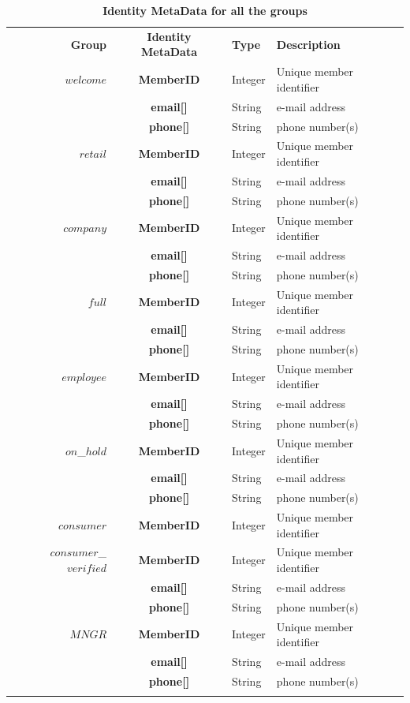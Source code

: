 \begin{table}[H]
\vspace{-0.5cm}
\begin{centering}
\small
{
\begin{tabular}{ r | c | l | l }
\hline
\textbf{Group}	& {\bf Identity MetaData} & {\bf Type} & {\bf Description} \\
\Xhline{1.5pt}
$welcome$	& {\bf MemberID}			&Integer	& Unique member identifier \\
			& {\bf email[]}				&String	& e-mail address \\		
			& {\bf phone[]}				&String	& phone number(s) \\
\hline
$retail$		& {\bf MemberID}			&Integer	& Unique member identifier \\
			& {\bf email[]}				&String	& e-mail address \\
			& {\bf phone[]}				&String	& phone number(s) \\
\hline
$company$	& {\bf MemberID}			&Integer	& Unique member identifier \\
			& {\bf email[]}				&String	& e-mail address \\
			& {\bf phone[]}				&String	& phone number(s) \\
\hline
$full$		& {\bf MemberID}			&Integer	& Unique member identifier \\
			& {\bf email[]}				&String	& e-mail address \\
			& {\bf phone[]}				&String	& phone number(s) \\
\hline
$employee$	& {\bf MemberID}			&Integer	& Unique member identifier \\
			& {\bf email[]}				&String	& e-mail address \\
			& {\bf phone[]}				&String	& phone number(s) \\
\hline
$on$\_$hold$	& {\bf MemberID}			&Integer	& Unique member identifier \\
			& {\bf email[]}				&String	& e-mail address \\
			& {\bf phone[]}				&String	& phone number(s) \\
\hline
$consumer$	& {\bf MemberID}	&Integer & Unique member identifier \\
\hline
$consumer$\_$verified$ & {\bf MemberID}		&Integer	& Unique member identifier \\
			& {\bf email[]}				&String	& e-mail address \\
			& {\bf phone[]}				&String	& phone number(s) \\
\hline
$MNGR$ 		& {\bf MemberID}			&Integer	& Unique member identifier \\
			& {\bf email[]}				&String	& e-mail address \\
			& {\bf phone[]}				&String	& phone number(s) \\
\Xhline{1.5pt}
\end{tabular}
}
\caption{\small\textbf{Identity MetaData for all the groups}}
\label{tab:IdentityMetaData}
\end{centering}
\vspace{-1cm}
\end{table}

